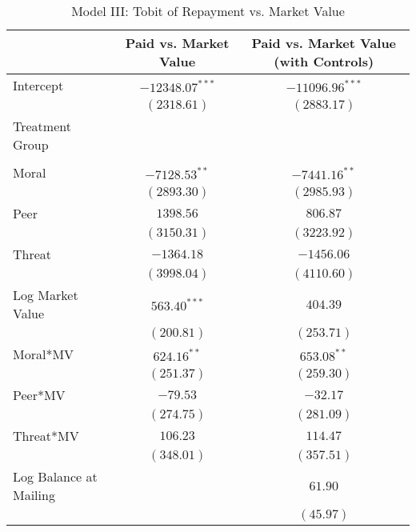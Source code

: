 \documentclass[12pt,titlepage]{article}
\begin{document}
\begin{table}[htbp]
\begin{center}
\caption{Model III: Tobit of Repayment vs. Market Value} \label{table:modelIII}
\begin{tabular}{l c c }
\hline
                       & Paid vs. Market Value & Paid vs. Market Value (with Controls) \\
\hline
Intercept              & $-12348.07^{***}$ & $-11096.96^{***}$ \\
                       & $(2318.61)$       & $(2883.17)$       \\
Treatment Group        &                   &                   \\
                       &                   &                   \\
\quad Moral            & $-7128.53^{**}$    & $-7441.16^{**}$    \\
                       & $(2893.30)$       & $(2985.93)$       \\
\quad Peer             & $1398.56$         & $806.87$          \\
                       & $(3150.31)$       & $(3223.92)$       \\
\quad Threat           & $-1364.18$        & $-1456.06$        \\
                       & $(3998.04)$       & $(4110.60)$       \\
Log Market Value       & $563.40^{***}$     & $404.39$          \\
                       & $(200.81)$        & $(253.71)$        \\
Moral*MV               & $624.16^{**}$      & $653.08^{**}$      \\
                       & $(251.37)$        & $(259.30)$        \\
Peer*MV                & $-79.53$          & $-32.17$          \\
                       & $(274.75)$        & $(281.09)$        \\
Threat*MV              & $106.23$          & $114.47$          \\
                       & $(348.01)$        & $(357.51)$        \\
Log Balance at Mailing &                   & $61.90$           \\
                       &                   & $(45.97)$         \\
\hline

\end{tabular}
\end{center}
\end{table}
\end{document}
